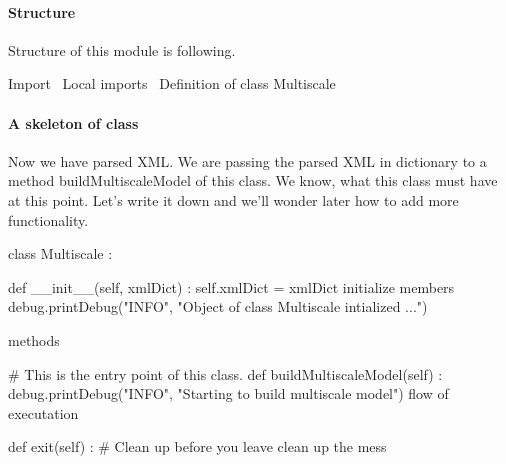 \documentclass[]{article}%
\begin{document}
\paragraph{Structure} Structure of this module is following. 

\nwenddocs{}\endmoddef\nwstartdeflinemarkup\nwenddeflinemarkup
\LA{}Import~{\nwtagstyle{}}\RA{}
\LA{}Local imports~{\nwtagstyle{}}\RA{}
\LA{}Definition of class \code{}Multiscale\edoc{}~{\nwtagstyle{}}\RA{}

\eatline
{}\nwendcode{}\nwdocspar
\paragraph{A skeleton of class}

  Now we have parsed XML. We are passing the parsed XML in dictionary to a
  method {\Tt{}buildMultiscaleModel\nwendquote} of this class. We know, what this class must
  have at this point. Let's write it down and we'll wonder later how to add more
  functionality. 
  
\nwenddocs{}\endmoddef\nwstartdeflinemarkup{}\nwenddeflinemarkup

class Multiscale :
  
  def __init__(self, xmlDict) :
    self.xmlDict = xmlDict 
    \LA{}initialize members~{\nwtagstyle{}}\RA{}
    debug.printDebug("INFO", "Object of class Multiscale intialized ...")

  \LA{}methods~{\nwtagstyle{}}\RA{} 

  # This is the entry point of this class.
  def buildMultiscaleModel(self) :
      debug.printDebug("INFO", "Starting to build multiscale model")   
      \LA{}flow of executation~{\nwtagstyle{}}\RA{}
  
  def exit(self) :
    # Clean up before you leave
    \LA{}clean up the mess~{\nwtagstyle{}}\RA{}
\end{document}
